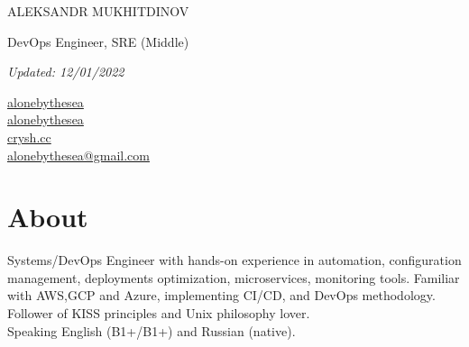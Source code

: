 \documentclass[11pt]{letter}
\newcommand{\forceindent}{\leavevmode{\parindent=1em\indent} %
}
\begin{document}
\begin{spacing}{2}
    {\centerline{{\huge \vphantom{Name}ALEKSANDR MUKHITDINOV}}}
    {\centerline{\large \vphantom{Position}DevOps Engineer, SRE (Middle)}}
    {\centerline{\textit{Updated: 12/01/2022}}}
\end{spacing}

{\setlength{\columnsep}{-0.9cm}\begin{multicols}{4}
    \begin{spacing}{2}\rmfamily
    \large{
        \vphantom{contacts}
        \faLinkedin \href{https://www.linkedin.com/in/alonebythesea}{\vphantom{LinkedIn} alonebythesea} \\
        \columnbreak
        \faGithubAlt \href{https://github.com/alonebythesea}{\vphantom{GitHub} alonebythesea} \\
        \columnbreak
        \faLink \href{https://crysh.cc}{\vphantom{Website} crysh.cc} \\
        \columnbreak
        \faEnvelope \href{mailto:alonebythesea@gmail.com}{\vphantom{Email} alonebythesea@gmail.com} \\
        \columnbreak
    }
  \end{spacing}\end{multicols}}

\section*{About\vphantom{about}}


\forceindent Systems/DevOps Engineer with hands-on experience in automation, configuration management, deployments optimization, microservices, monitoring tools. Familiar with AWS,GCP and Azure, implementing CI/CD, and DevOps methodology. Follower of KISS principles and Unix philosophy lover. \\


\forceindent Speaking English (B1+/B1+) and Russian (native).

\end{document}
